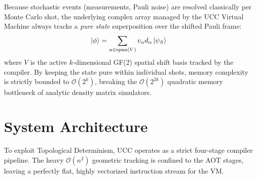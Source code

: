 \documentclass[11pt]{article}
\begin{document}
Because stochastic events (measurements, Pauli noise) are resolved classically per Monte Carlo shot, the underlying complex array managed by the UCC Virtual Machine always tracks a \textit{pure state} superposition over the shifted Pauli frame:
\begin{equation}
    \ket{\phi} = \sum_{\alpha \in \text{span}(V)} v_\alpha d_\alpha \ket{\psi_S}
\end{equation}
where $V$ is the active $k$-dimensional GF(2) spatial shift basis tracked by the compiler. By keeping the state pure within individual shots, memory complexity is strictly bounded to $\mathcal{O}(2^k)$, breaking the $\mathcal{O}(2^{2k})$ quadratic memory bottleneck of analytic density matrix simulators.

\section{System Architecture}

To exploit Topological Determinism, UCC operates as a strict four-stage compiler pipeline. The heavy $\mathcal{O}(n^2)$ geometric tracking is confined to the AOT stages, leaving a perfectly flat, highly vectorized instruction stream for the VM.
\end{document}
